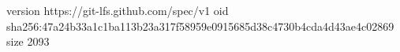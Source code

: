 version https://git-lfs.github.com/spec/v1
oid sha256:47a24b33a1c1ba113b23a317f58959e0915685d38c4730b4cda4d43ae4c02869
size 2093
